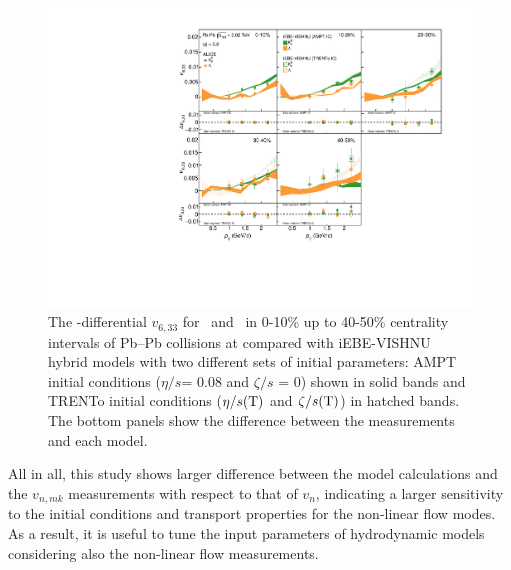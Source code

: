  \begin{figure}[h]
\begin{center}
\includegraphics[scale=0.73]{figures/model/TrentoAndAMPT_v633_gap00_LambdaK0s.pdf}
\end{center}
\caption{The \pT-differential $v_{6,33}$ for \Ks~and \lambdas~in 0-10\% up to 40-50\% centrality intervals of Pb--Pb collisions at \sNN compared with iEBE-VISHNU hybrid models with two different sets of initial parameters: AMPT initial conditions ($\eta/s$= 0.08 and $\zeta/s$ = 0) shown in solid bands and TRENTo initial conditions ($\eta/s({\rm T})$ and $\zeta/s({\rm T})$) in hatched bands. The bottom panels show the difference between the measurements and each model.}
\label{v633_model_KL}
\end{figure}


All in all, this study shows larger difference between the model calculations and the $v_{n,mk}$ measurements with respect to that of $v_{n}$, indicating a larger sensitivity to the initial conditions and transport properties for the non-linear flow modes. As a result, it is useful to tune the input parameters of hydrodynamic models considering also the non-linear flow measurements. %







\newpage